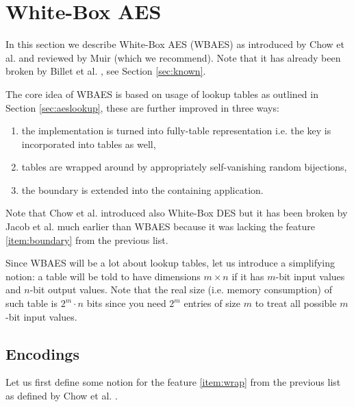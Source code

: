 \section{White-Box AES}
\label{sec:wbaes}

In this section we describe White-Box AES (WBAES) as introduced by Chow et al. \cite{chow2003aes} and reviewed by Muir \cite{muir2013tutorial} (which we recommend). Note that it has already been broken by Billet et al. \cite{billet2005cryptanalysis}, see Section \ref{sec:known}.   %

The core idea of WBAES is based on usage of lookup tables as outlined in Section \ref{sec:aeslookup}, these are further improved in three ways:
\begin{enumerate}
	\item the implementation is turned into fully-table representation i.e. the key is incorporated into tables as well,
	\item tables are wrapped around by appropriately self-vanishing random bijections, \label{item:wrap}
	\item the boundary is extended into the containing application. \label{item:boundary}
\end{enumerate}
Note that Chow et al. introduced also White-Box DES \cite{chow2003des} but it has been broken by Jacob et al. \cite{jacob2003attacking} much earlier than WBAES because it was lacking the feature \ref{item:boundary} from the previous list.

\begin{notion}
\label{notion:table}
	Since WBAES will be a lot about lookup tables, let us introduce a simplifying notion: a table will be told to have dimensions $m\times n$ if it has $m$-bit input values and $n$-bit output values. Note that the real size (i.e. memory consumption) of such table is $2^m\cdot n$ bits since you need $2^m$ entries of size $m$ to treat all possible $m$-bit input values.
\end{notion}



\subsection{Encodings}

Let us first define some notion for the feature \ref{item:wrap} from the previous list as defined by Chow et al. \cite{chow2003aes}.

